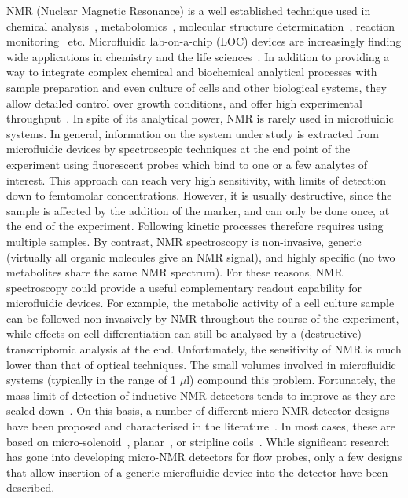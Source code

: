 \documentclass[preprint,12pt]{article}
\begin{document}
NMR (Nuclear Magnetic Resonance) is a well established technique used in chemical analysis~\cite{NMR-chemical-1995, hills1994magnetic, rabenstein1991quantitative}, metabolomics~\cite{nmr-metabolomics-future-2017,nmr-metabolomics-2016}, molecular structure determination~\cite{wuthrich1990protein}, reaction monitoring~\cite{maiwald2004quantitative} etc. Microfluidic lab-on-a-chip (LOC) devices are increasingly finding wide applications in chemistry and the life sciences~\cite{whitesides2006origins,mark2010microfluidic}. In addition to providing a way to integrate complex chemical and biochemical analytical processes with sample preparation and even culture of cells and other biological systems, they allow detailed control over growth conditions, and offer high experimental throughput~\cite{cellonchip-2006,cellonchip-review,tissueonchip-2008}. In spite of its analytical power, NMR is rarely used in microfluidic systems. In general, information on the system under study is extracted from microfluidic devices by spectroscopic techniques at the end point of the experiment using fluorescent probes which bind to one or a few analytes of interest. This approach can reach very high sensitivity, with limits of detection down to femtomolar concentrations. However, it is usually destructive, since the sample is affected by the addition of the marker, and can only be done once, at the end of the experiment. Following kinetic processes therefore requires using multiple samples. By contrast, NMR spectroscopy is non-invasive, generic (virtually all organic molecules give an NMR signal), and highly specific (no two metabolites share the same NMR spectrum). For these reasons, NMR spectroscopy could provide a useful complementary readout capability for microfluidic devices. For example, the metabolic activity of a cell culture sample can be followed non-invasively by NMR throughout the course of the experiment, while effects on cell differentiation can still be analysed by a (destructive) transcriptomic analysis at the end. Unfortunately, the sensitivity of NMR is much lower than that of optical techniques. The small volumes involved in microfluidic systems (typically in the range of 1 $\mu$l) compound this problem. Fortunately, the mass limit of detection of inductive NMR detectors tends to improve as they are scaled down~\cite{Olson1995}. On this basis, a number of different micro-NMR detector designs have been proposed and characterised in the literature~\cite{utz2012review,micronmr2014review}. In most cases, these are based on micro-solenoid~\cite{SUBRAMANIAN1998,Pines2007}, planar~\cite{Maguire2007,dieter2008,EHRMANN200}, or stripline coils~\cite{stripline_jan}. While significant research has gone into developing micro-NMR detectors for flow probes, only a few designs that allow insertion of a generic microfluidic device into the detector have been described.\par
\end{document}
